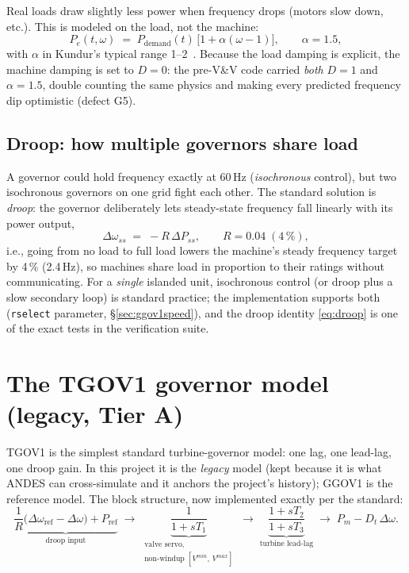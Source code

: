\documentclass[11pt]{article}
\begin{document}
Real loads draw slightly less power when frequency drops (motors slow
down, etc.). This is modeled on the load, not the machine:
\begin{equation}
  P_e(t,\omega) \;=\; P_\text{demand}(t)\,\bigl[1 + \alpha(\omega - 1)\bigr],
  \qquad \alpha = 1.5,
  \label{eq:loaddamp}
\end{equation}
with $\alpha$ in Kundur's typical range 1--2~\cite{kundur}. Because the
load damping is explicit, the machine damping is set to $D = 0$: the
pre-V\&V code carried \emph{both} $D = 1$ and $\alpha = 1.5$, double
counting the same physics and making every predicted frequency dip
optimistic (defect G5).

\subsection{Droop: how multiple governors share load}
\label{sec:droop}

A governor could hold frequency exactly at 60\,Hz (\emph{isochronous}
control), but two isochronous governors on one grid fight each other.
The standard solution is \emph{droop}: the governor deliberately lets
steady-state frequency fall linearly with its power output,
\begin{equation}
  \Delta\omega_{ss} \;=\; -R\,\Delta P_{ss},
  \qquad R = 0.04 \;(4\,\%),
  \label{eq:droop}
\end{equation}
i.e., going from no load to full load lowers the machine's steady
frequency target by 4\,\% (2.4\,Hz), so machines share load in proportion
to their ratings without communicating. For a \emph{single} islanded unit,
isochronous control (or droop plus a slow secondary loop) is standard
practice; the implementation supports both (\texttt{rselect} parameter,
\S\ref{sec:ggov1speed}), and the droop identity \eqref{eq:droop} is one of
the exact tests in the verification suite.

\section{The TGOV1 governor model (legacy, Tier A)}
\label{sec:tgov1}

\textsc{TGOV1} is the simplest standard turbine-governor model: one lag,
one lead-lag, one droop gain. In this project it is the \emph{legacy}
model (kept because it is what ANDES can cross-simulate and it anchors the
project's history); GGOV1 is the reference model. The block structure, now
implemented exactly per the standard:
\begin{equation}
  \underbrace{\frac{1}{R}\bigl(\Delta\omega_\text{ref} - \Delta\omega\bigr) + P_\text{ref}}_{\text{droop input}}
  \;\longrightarrow\;
  \underbrace{\frac{1}{1 + sT_1}}_{\substack{\text{valve servo,}\\ \text{non-windup } [V^{min},\,V^{max}]}}
  \;\longrightarrow\;
  \underbrace{\frac{1 + sT_2}{1 + sT_3}}_{\text{turbine lead-lag}}
  \;\longrightarrow\; P_m - D_t\,\Delta\omega .
  \label{eq:tgov1}
\end{equation}
\end{document}
